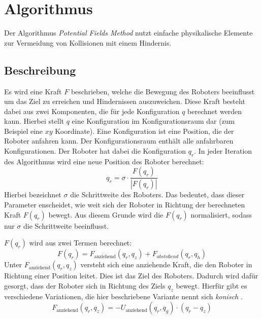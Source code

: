 \section{Algorithmus}\label{sec:algo}

Der Algorithmus \textit{Potential Fields Method} nutzt einfache physikalische Elemente zur Vermeidung von Kollisionen mit einem Hindernis.

\subsection{Beschreibung}
Es wird eine Kraft $F$ beschrieben, welche die Bewegung des Roboters beeinflusst um das Ziel zu erreichen und Hindernissen auszuweichen.
Diese Kraft besteht dabei aus zwei Komponenten, die für jede Konfiguration $q$ berechnet werden kann.
Hierbei stellt $q$ eine Konfiguration im Konfigurationsraum dar (zum Beispiel eine $xy$ Koordinate).
Eine Konfiguration ist eine Position, die der Roboter anfahren kann.
Der Konfigurationsraum enthält alle anfahrbaren Konfigurationen.
Der Roboter hat dabei die Konfiguration $q_r$.
In jeder Iteration des Algorithmus wird eine neue Position des Roboter berechnet:
\begin{equation}
	q_r = \sigma \cdot \frac{F(q_r)}{|F(q_r)|}
\end{equation}
Hierbei bezeichnet $\sigma$ die Schrittweite des Roboters. Das bedeutet, dass dieser Parameter enscheidet, wie weit sich der Roboter in Richtung der berechneten Kraft $F(q_r)$ bewegt. Aus diesem Grunde wird die $F(q_r)$ normalisiert, sodass nur $\sigma$ die Schrittweite beeinflusst.

$F(q_r)$ wird aus zwei Termen berechnet:
\begin{equation}
     F(q_r) = F_{\text{anziehend}}(q_r, q_z) + F_{abstoßend}(q_r,q_h)
\end{equation}
Unter $F_{\text{anziehend}}(q_r, q_z)$ versteht sich eine anziehende Kraft, die den Roboter in  Richtung einer Position leitet.
Dies ist das Ziel des Roboters.
Dadurch wird dafür gesorgt, dass der Roboter sich in Richtung des Ziels $q_z$ bewegt.
Hierfür gibt es verschiedene Variationen, die hier beschriebene Variante nennt sich \textit{konisch} \cite{Formulars}.
\begin{equation}
	F_{\text{anziehend}}(q_r, q_z)= -U_{\text{anziehend}}(q_r, q_g) \cdot (q_r - q_z)
\end{equation}

